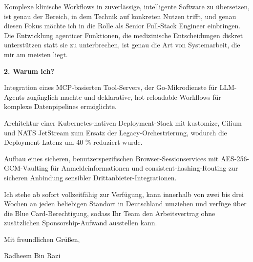 \documentclass[11pt,a4paper]{coverletter}
\begin{document}
Komplexe klinische Workflows in zuverlässige, intelligente Software zu übersetzen, ist genau der Bereich, in dem Technik auf konkreten Nutzen trifft, und genau diesen Fokus möchte ich in die Rolle als Senior Full-Stack Engineer einbringen. Die Entwicklung agenticer Funktionen, die medizinische Entscheidungen diskret unterstützen statt sie zu unterbrechen, ist genau die Art von Systemarbeit, die mir am meisten liegt.

\vspace{8pt}\noindent\textbf{2. Warum ich?}\par\vspace{3pt}

\bullets

  \item Integration eines MCP-basierten Tool-Servers, der Go-Mikrodienste für LLM-Agents zugänglich machte und deklarative, hot-reloadable Workflows für komplexe Datenpipelines ermöglichte.

  \item Architektur einer Kubernetes-nativen Deployment-Stack mit kustomize, Cilium und NATS JetStream zum Ersatz der Legacy-Orchestrierung, wodurch die Deployment-Latenz um 40 \% reduziert wurde.

  \item Aufbau eines sicheren, benutzerspezifischen Browser-Sessionservices mit AES-256-GCM-Vaulting für Anmeldeinformationen und consistent-hashing-Routing zur sicheren Anbindung sensibler Drittanbieter-Integrationen.

\bulletsend

Ich stehe ab sofort vollzeitfähig zur Verfügung, kann innerhalb von zwei bis drei Wochen an jeden beliebigen Standort in Deutschland umziehen und verfüge über die Blue Card-Berechtigung, sodass Ihr Team den Arbeitsvertrag ohne zusätzlichen Sponsorship-Aufwand ausstellen kann.

\closing{Mit freundlichen Grüßen,}{Radheem Bin Razi}
\end{document}
